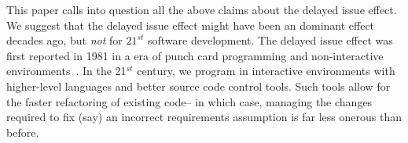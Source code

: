 \documentclass{sig-alternate}
\newcommand{\fig}[1]{Figure~\ref{fig:#1}}
\begin{document}

This paper calls into question all the above claims about the delayed
issue effect. We suggest that the delayed issue effect might have been an dominant
effect decades ago,  but {\em not}  for $21^{\mathit{st}}$
software development. 
 The delayed issue effect was first reported in 1981 in a era of punch card programming
and non-interactive environments~\cite{Boehm81}. In the 21$^\mathit{st}$ century, we  program in 
interactive environments with higher-level languages and better source code control
tools. Such tools allow for the faster refactoring of existing
code-- in which case, 
managing the changes required to fix (say) an incorrect requirements assumption
is far less    onerous    than before.
\end{document}

